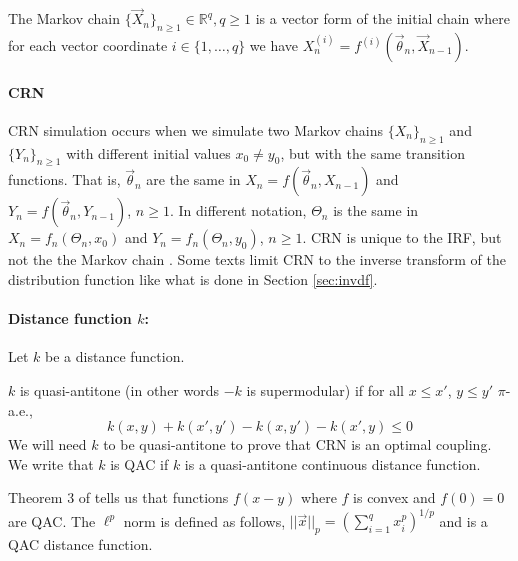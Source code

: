 \documentclass[12pt]{article}
\theoremstyle{plain}%
\newtheorem{lemma}[theorem]{Lemma}
\theoremstyle{definition}
\begin{document}
%	
%		
%	

The Markov chain $\{\vec{X}_n\}_{n\geq 1}\in \mathbb{R}^q, q\geq 1$ is a vector form of the initial chain where for each vector coordinate $i\in\{1,\ldots, q\}$ we have $X^{(i)}_n=f^{(i)}(\vec{\theta}_n,\vec{X}_{n-1})$.  
 \paragraph{CRN} CRN simulation occurs when we simulate two Markov chains $\{X_n\}_{n\geq 1}$ and $\{Y_n\}_{n\geq 1}$ with different initial values $x_0\neq y_0$, but with the same transition functions. That is, $\vec{\theta}_n$ are the same in $X_n = f(\vec{\theta}_n,X_{n-1})$ and $Y_n = f(\vec{\theta}_n,Y_{n-1})$, $n\geq 1$. In different notation, $\Theta_n$ is the same in $X_n = f_n(\Theta_n,x_0)$ and $Y_n = f_n(\Theta_n,y_{0})$, $n\geq 1$. CRN is unique to the IRF, but not the the Markov chain \cite{crn}. Some texts limit CRN to the inverse transform of the distribution function \cite{crn,jacob} like what is done in Section \ref{sec:invdf}.
 
\paragraph{Distance function $k$:}Let $k$ be a distance function. 

$k$ is quasi-antitone (in other words $-k$ is supermodular) if for all $x\leq x'$, $y\leq y'$ $\pi$-a.e.,
$$k(x,y)+k(x',y')-k(x,y')-k(x',y)\leq 0$$
We will need $k$ to be quasi-antitone to prove that CRN is an optimal coupling. We write that $k$ is QAC if $k$ is a quasi-antitone continuous distance function. 


Theorem 3 of \cite{rearrangefunc} tells us that functions $f(x-y)$ where $f$ is convex and $f(0)=0$ are QAC. The $\ell^p$ norm is defined as follows, $||\vec{x}||_p=\left(\sum_{i=1}^q x_i^p\right)^{1/p}$ and is a QAC distance function. 

\end{document}
